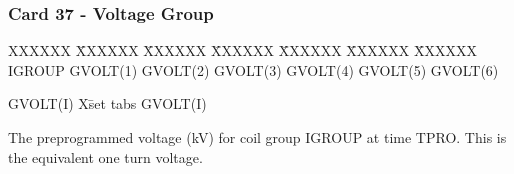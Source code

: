 \newpage \subsubsection{Card 37 - Voltage Group}
\begin{tabbing}
XXXXXX \= XXXXXX \= XXXXXX \= XXXXXX \= XXXXXX \= XXXXXX \=
XXXXXX       \\
\footnotesize  IGROUP \>\footnotesize GVOLT(1)  \>\footnotesize GVOLT(2) \>\footnotesize
GVOLT(3) \>\footnotesize GVOLT(4) \>\footnotesize GVOLT(5) \>\footnotesize GVOLT(6)
\end{tabbing}
\begin{tabbing}
GVOLT(I) X\= set tabs \kill
GVOLT(I) \> \parbox[t]{\width}{The preprogrammed voltage (kV) for coil group IGROUP at
time TPRO.  This is the equivalent one turn voltage.}
\end{tabbing}

